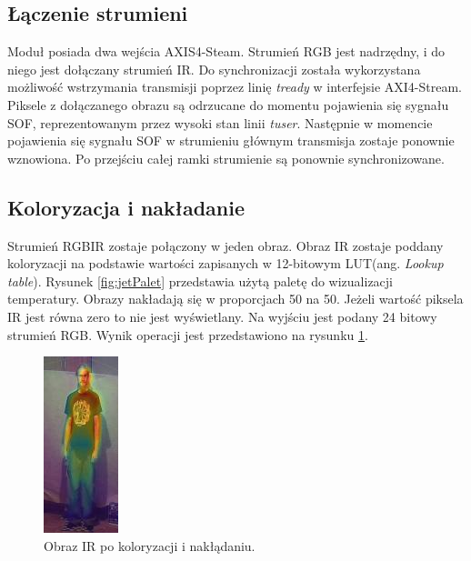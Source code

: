 \subsection{Łączenie strumieni}

Moduł posiada dwa wejścia AXIS4-Steam. Strumień RGB jest nadrzędny, i do niego jest dołączany  strumień IR. %
Do synchronizacji została wykorzystana możliwość wstrzymania transmisji poprzez linię \textit{tready} w interfejsie AXI4-Stream. 
Piksele z dołączanego obrazu są odrzucane do momentu pojawienia się sygnału SOF, reprezentowanym przez wysoki stan linii \textit{tuser}. Następnie w momencie pojawienia się sygnału SOF w strumieniu głównym transmisja zostaje ponownie wznowiona. %
Po przejściu całej ramki strumienie są ponownie synchronizowane.  
\subsection{Koloryzacja i nakładanie}
Strumień RGBIR zostaje połączony w jeden obraz. 
Obraz IR zostaje poddany koloryzacji na podstawie wartości zapisanych w 12-bitowym LUT(ang. \textit{Lookup table}). Rysunek \ref{fig:jetPalet} przedstawia użytą paletę do wizualizacji temperatury. Obrazy nakładają się w proporcjach 50 na 50. Jeżeli wartość piksela IR jest równa zero to nie jest wyświetlany.
Na wyjściu jest podany 24 bitowy strumień RGB. Wynik operacji jest przedstawiono na rysunku \ref{fig:koloryzacja}.
\begin{figure}
\centering
\includegraphics[width=0.3\linewidth]{images/koloryzacja.jpg}
\caption[Obraz IR po koloryzacji i nakłądaniu.]{Obraz IR po koloryzacji i nakłądaniu.}
\label{fig:koloryzacja}
\end{figure}

